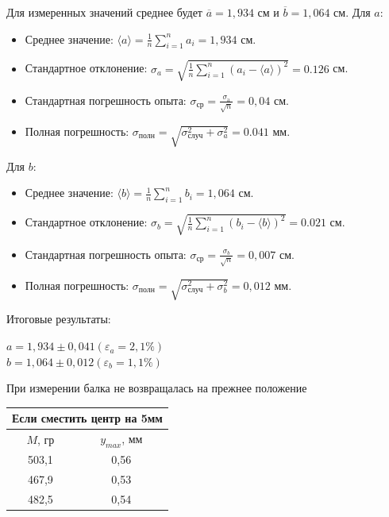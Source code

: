 \documentclass[a4paper]{article}
\begin{document}
Для измеренных значений среднее будет $\overline{a} = 1,934 $ см и $\overline{b} = 1,064$ см.
Для $a$:
\begin{itemize}
\item Среднее значение: $\langle a \rangle = \frac{1}{n}\sum\limits_{i=1}^n a_{i} = 1,934$ см. 
\item Стандартное отклонение: $\sigma_{a} = \sqrt{\frac{1}{n}\sum\limits_{i=1}^n(a_{i} - \langle a \rangle)^2} = 0.126$ см.
\item Стандартная погрешность опыта: $\sigma_\text{ср} = \frac{\sigma_{\text{a}}}{\sqrt{n}} =  0,04$ см.
\item Полная погрешность: $\sigma_{\text{полн}} = \sqrt{\sigma_{\text{случ}}^2 + \sigma_{a}^2} = 0.041$ мм.
\end{itemize}
Для $b$:
\begin{itemize}
\item Среднее значение: $\langle b \rangle = \frac{1}{n}\sum\limits_{i=1}^n b_{i} = 1,064$ см. 
\item Стандартное отклонение: $\sigma_{b} = \sqrt{\frac{1}{n}\sum\limits_{i=1}^n(b_{i} - \langle b \rangle)^2} = 0.021$ см.
\item Стандартная погрешность опыта: $\sigma_\text{ср} = \frac{\sigma_{b}}{\sqrt{n}} =  0,007$ см.
\item Полная погрешность: $\sigma_{\text{полн}} = \sqrt{\sigma_{\text{случ}}^2 + \sigma_{b}^2} = 0,012$ мм.
\end{itemize}
Итоговые результаты: \par
$a = 1,934 \pm 0,041 (\varepsilon_{a} = 2,1\%)$\\
$b = 1,064 \pm 0,012 (\varepsilon_{b} = 1,1\%)$

При измерении балка не возвращалась на прежнее положение

\begin{table}[h!]
\begin{center}
\begin{tabular}{|cc|}
\hline
\multicolumn{2}{|c|}{Если сместить центр на 5мм} \\ \hline
\multicolumn{1}{|c|}{$M$, гр}   & $y_{max}$, мм  \\ \hline
\multicolumn{1}{|c|}{503,1}     & 0,56           \\ \hline
\multicolumn{1}{|c|}{467,9}     & 0,53           \\ \hline
\multicolumn{1}{|c|}{482,5}     & 0,54           \\ \hline
\end{tabular}
\end{center}
\end{table}
\end{document}
